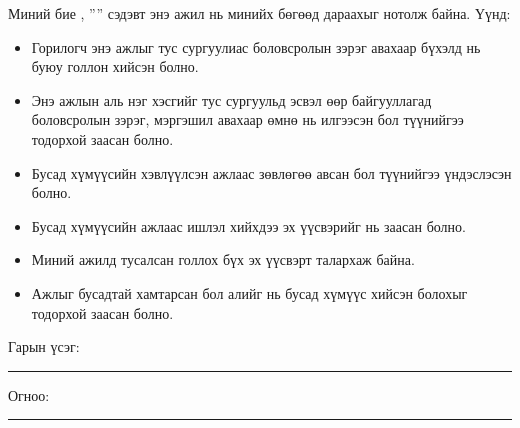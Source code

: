 \begin{declaration}
\addchaptertocentry{\authorshipname}

\noindent Миний бие \shortname, ''{\ttitle}'' сэдэвт энэ ажил нь минийх бөгөөд дараахыг нотолж байна. Үүнд:

\begin{itemize} 
\item Горилогч энэ ажлыг тус сургуулиас боловсролын зэрэг авахаар бүхэлд нь буюу голлон хийсэн болно.
\item Энэ ажлын аль нэг хэсгийг тус сургуульд эсвэл өөр байгууллагад боловсролын зэрэг, мэргэшил авахаар өмнө нь илгээсэн бол түүнийгээ тодорхой заасан болно.
\item Бусад хүмүүсийн хэвлүүлсэн ажлаас зөвлөгөө авсан бол түүнийгээ үндэслэсэн болно.
\item Бусад хүмүүсийн ажлаас ишлэл хийхдээ эх үүсвэрийг нь заасан болно.
\item Миний ажилд тусалсан голлох бүх эх үүсвэрт талархаж байна.
\item Ажлыг бусадтай хамтарсан бол алийг нь бусад хүмүүс хийсэн болохыг тодорхой заасан болно.
\end{itemize}
\bigskip
 
\noindent Гарын үсэг: \rule[-0.5em]{12.7em}{0.5pt}
\bigskip

\noindent Огноо: \rule[-0.5em]{15em}{0.5pt}

\end{declaration}

\clearpage

